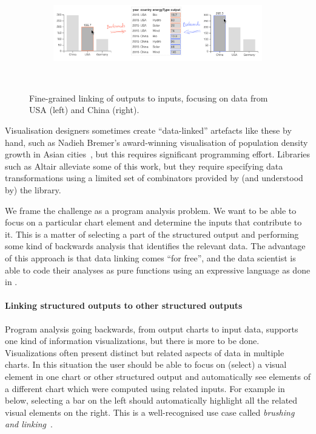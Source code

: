 \begin{figure}[H]
   \begin{subfigure}[b]{0.99\textwidth}
      \centering
      {\includegraphics[scale=0.36]{fig/example/data-linking-merged.png}}
   \end{subfigure}\\
   \begin{subfigure}{0.65\textwidth}
      \small
      
   \end{subfigure}
   \caption{Fine-grained linking of outputs to inputs, focusing on data from USA (left) and China (right). }
   \label{fig:introduction:data-linking}
\end{figure}

Visualisation designers sometimes create ``data-linked'' artefacts like these by hand, such as Nadieh Bremer's award-winning visualisation of population density growth in Asian cities~\cite{bremer15}, but this requires significant programming effort. Libraries such as Altair \cite{vanderPlas18} alleviate some of this work, but they require specifying data transformations using a limited set of combinators provided by (and understood by) the library.

We frame the challenge as a program analysis problem. We want to be able to focus on a particular chart element and determine the inputs that contribute to it. This is a matter of selecting a part of the structured output and performing some kind of backwards analysis that identifies the relevant data. The advantage of this approach is that data linking comes ``for free'', and the data scientist is able to code their analyses as pure functions using an expressive language as done in .

\paragraph{Linking structured outputs to other structured outputs}
Program analysis going backwards, from output charts to input data, supports one kind of information visualizations, but there is more to be done. Visualizations often present distinct but related aspects of data in multiple charts. In this situation the user should be able to focus on (select) a visual element in one chart or other structured output and automatically see elements of a different chart which were computed using related inputs. For example in  below, selecting a bar on the left should automatically highlight all the related visual elements on the right. This is a well-recognised use case called \emph{brushing and linking}~\cite{becker87}.

